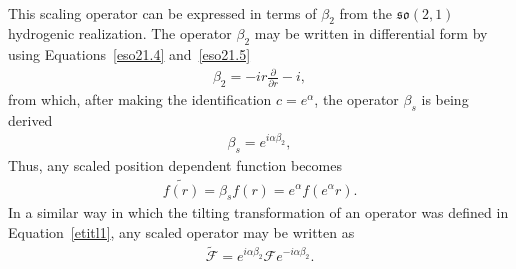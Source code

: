 \documentclass[12pt,a4paper]{report}
\theoremstyle{definition}
\theoremstyle{remark}
\theoremstyle{remark}
\begin{document}
\begin{appendices}
\begin{align*}
\end{align*}
This scaling operator can be expressed in terms of $\beta_2$ from the $\mathfrak{so}(2,1)$ hydrogenic realization. The operator $\beta_2$ may be written in differential form by using Equations~\ref{eso21.4} and~\ref{eso21.5}
\begin{align*}
\beta_2=-ir\frac{\partial}{\partial r}-i,
\end{align*}
from which, after making the identification $c=e^{\alpha}$, the operator $\beta_s$ is being derived
\begin{align*}
\beta_s=e^{i\alpha \beta_2},
\end{align*}
Thus, any scaled position dependent function becomes
\begin{align*}
\widetilde{f(r)}=\beta_s f(r)=e^{\alpha}f(e^\alpha r).
\end{align*}
In a similar way in which the tilting transformation of an operator was defined in Equation~\ref{etitl1}, any scaled operator may be written as
\begin{align*}
\widetilde{\mathcal{F}}=e^{i\alpha\beta_2}\mathcal{F}e^{-i\alpha\beta_2}.
\end{align*}
\end{appendices}

\newpage
{}

\end{document}

